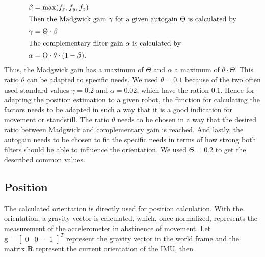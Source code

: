 \documentclass[letterpaper, 10 pt, conference]{ieeeconf}  %
\newcommand{\M}[1]{\mathbf{#1}} %
\newcommand{\V}[1]{\mathbf{#1}} %
\begin{document}
\begin{align}
\beta &= \max(f_x,f_y,f_z)\label{eq:weight_autogain}\\
\intertext{Then the Madgwick gain $\gamma$ for a given autogain $\Theta$ is calculated by} 
\gamma &= \Theta \cdot \beta \\
\intertext{The complementary filter gain $\alpha$ is calculated by}
\alpha &= \Theta \cdot \theta \cdot(1-\beta).
\end{align}
Thus, the Madgwick gain has a maximum of $\Theta$ and $\alpha$ a maximum of $\theta\cdot \Theta$. This ratio $\theta$ can be adapted to specific needs.
We used $\theta = 0.1$ because of the two often used standard values $\gamma = 0.2$ and $\alpha= 0.02$, which have the ration $0.1$.
Hence for adapting the position estimation to a given robot, the function for calculating the factors needs to be adapted in such a way that it is a good indication for movement or standstill.
The ratio $\theta$ needs to be chosen in a way that the desired ratio between Madgwick and complementary gain is reached.
And lastly, the autogain needs to be chosen to fit the specific needs in terms of how strong both filters should be able to influence the orientation.
We used $\Theta = 0.2$ to get the described common values.


\subsection{Position}
The calculated orientation is directly used for position calculation.
With the orientation, a gravity vector is calculated, which, once normalized, represents the measurement of the accelerometer in abstinence of movement. 
Let $\V g=\begin{bmatrix}0 &0 & -1 \end{bmatrix}^T$ represent the gravity vector in the world frame and the matrix $\M R$ represent the current orientation of the IMU, then
\end{document}
